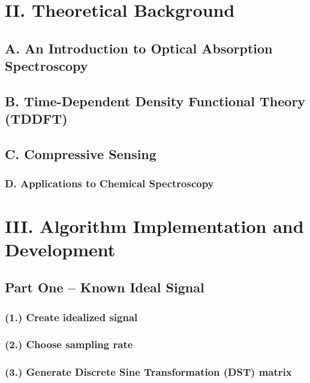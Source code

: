 \documentclass[11pt]{article}
\begin{document}

\section*{II.	Theoretical Background}	%
\subsection*{A.	An Introduction to Optical Absorption Spectroscopy} %

\subsection*{B.	Time-Dependent Density Functional Theory (TDDFT)} %

\subsection*{C.	Compressive Sensing}	%

\subsubsection*{D.	Applications to Chemical Spectroscopy}	%




\section*{III.	Algorithm Implementation and Development}
\subsection*{Part One -- Known Ideal Signal}
\subsubsection*{(1.)	Create idealized signal}
\subsubsection*{(2.)	Choose sampling rate}
\subsubsection*{(3.)	Generate Discrete Sine Transformation (DST) matrix} 
\end{document}
